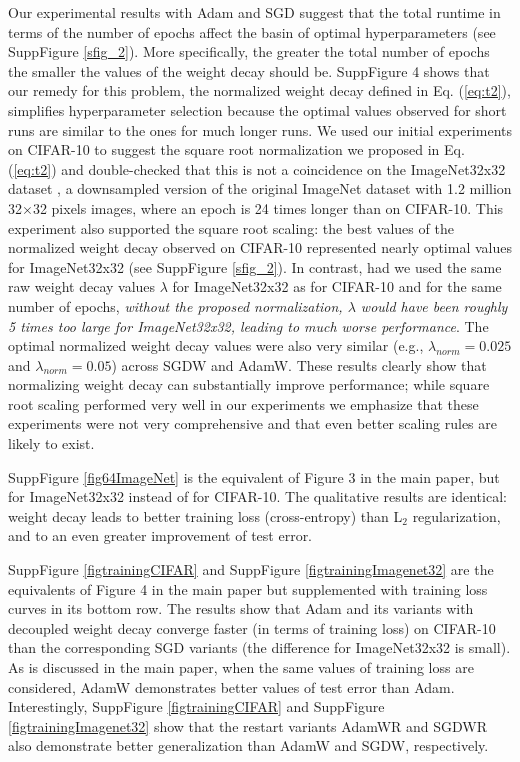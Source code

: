 \documentclass[usenames,dvipsnames]{article}
\begin{document}
Our experimental results with Adam and SGD suggest that the total runtime in terms of the number of epochs affect the basin of optimal hyperparameters (see SuppFigure \ref{sfig_2}). 
More specifically, the greater the total number of epochs the smaller the values of the weight decay should be. 
SuppFigure 4
shows that our remedy for this problem, the normalized weight decay defined in Eq. (\ref{eq:t2}), simplifies hyperparameter selection because the optimal values observed for short runs are similar to the ones for much longer runs. 
We used our initial experiments on CIFAR-10 to suggest the square root normalization we proposed in Eq. (\ref{eq:t2}) and double-checked that this is not a coincidence on the ImageNet32x32 dataset \citep{chrabaszcz2017downsampled}, a downsampled version of the original ImageNet dataset with 1.2 million  32$\times$32 pixels images, where an epoch is 24 times longer than on CIFAR-10. This experiment also supported the square root scaling:  the best values of the normalized weight decay observed on CIFAR-10 represented nearly optimal values for ImageNet32x32 (see SuppFigure \ref{sfig_2}).
In contrast, had we used the same raw weight decay values $\lambda$ for ImageNet32x32 as for CIFAR-10 and for the same number of epochs, \emph{without the proposed normalization, $\lambda$ would have been roughly 5 times too large for ImageNet32x32, leading to much worse performance}. 
The optimal normalized weight decay values were also very similar (e.g., $\lambda_{norm} = 0.025$ and $\lambda_{norm} = 0.05$) across SGDW and AdamW.
These results clearly show that normalizing weight decay can substantially improve performance; while square root scaling performed very well in our experiments we emphasize that these experiments were not very comprehensive and that even better scaling rules are likely to exist. 

SuppFigure \ref{fig64ImageNet} is the equivalent of Figure 3 in the main paper, but for ImageNet32x32 instead of for CIFAR-10. The  qualitative results are identical: weight decay leads to better training loss (cross-entropy) than L$_2$ regularization, and to an even greater improvement of test error.

SuppFigure \ref{figtrainingCIFAR} and SuppFigure \ref{figtrainingImagenet32} are the equivalents of Figure 4 in the main paper but supplemented with training loss curves in its bottom row. The results show that Adam and its variants with decoupled weight decay converge faster (in terms of training loss) on CIFAR-10 than the corresponding SGD variants (the difference for ImageNet32x32 is small). As is discussed in the main paper, when the same values of training loss are considered, AdamW demonstrates better values of test error than Adam. Interestingly, SuppFigure \ref{figtrainingCIFAR} and SuppFigure \ref{figtrainingImagenet32} show that the restart variants AdamWR and SGDWR also demonstrate better generalization than AdamW and SGDW, respectively. 
\end{document}
